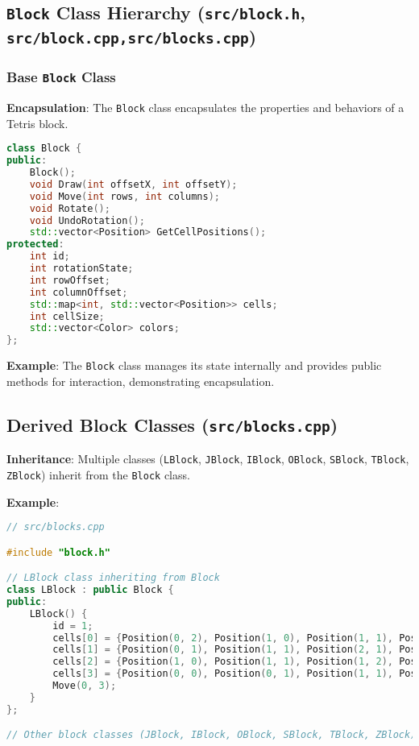 \documentclass{article}
\begin{document}
\subsection{\texttt{Block} Class Hierarchy (\texttt{src/block.h}, \texttt{src/block.cpp,\texttt{src/blocks.cpp}})}
\subsubsection{Base \texttt{Block} Class}
\textbf{Encapsulation}: The \texttt{Block} class encapsulates the properties and behaviors of a Tetris block.

\begin{lstlisting}[language=C++]
class Block {
public:
    Block();
    void Draw(int offsetX, int offsetY);
    void Move(int rows, int columns);
    void Rotate();
    void UndoRotation();
    std::vector<Position> GetCellPositions();
protected:
    int id;
    int rotationState;
    int rowOffset;
    int columnOffset;
    std::map<int, std::vector<Position>> cells;
    int cellSize;
    std::vector<Color> colors;
};
\end{lstlisting}

\textbf{Example}: The \texttt{Block} class manages its state internally and provides public methods for interaction, demonstrating encapsulation.

\subsection{Derived Block Classes (\texttt{src/blocks.cpp})}

\textbf{Inheritance}: Multiple classes (\texttt{LBlock}, \texttt{JBlock}, \texttt{IBlock}, \texttt{OBlock}, \texttt{SBlock}, \texttt{TBlock}, \texttt{ZBlock}) inherit from the \texttt{Block} class.

\textbf{Example}:

\begin{lstlisting}[language=C++]
// src/blocks.cpp

#include "block.h"

// LBlock class inheriting from Block
class LBlock : public Block {
public:
    LBlock() {
        id = 1;
        cells[0] = {Position(0, 2), Position(1, 0), Position(1, 1), Position(1, 2)};
        cells[1] = {Position(0, 1), Position(1, 1), Position(2, 1), Position(2, 2)};
        cells[2] = {Position(1, 0), Position(1, 1), Position(1, 2), Position(2, 0)};
        cells[3] = {Position(0, 0), Position(0, 1), Position(1, 1), Position(2, 1)};
        Move(0, 3);
    }
};

// Other block classes (JBlock, IBlock, OBlock, SBlock, TBlock, ZBlock) defined similarly
\end{lstlisting}
\end{document}
